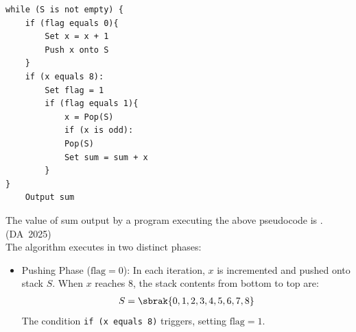\begin{enumerate}[label=\thesubsection.\arabic*, ref=\thesubsection.\theenumi]
\begin{lstlisting}[frame=single, basicstyle=\rmfamily, xleftmargin=0pt]
while (S is not empty) {
	if (flag equals 0){
		Set x = x + 1
		Push x onto S
	}
	if (x equals 8):
		Set flag = 1
		if (flag equals 1){
			x = Pop(S)
			if (x is odd):
			Pop(S)
			Set sum = sum + x
		}
}
	Output sum
\end{lstlisting}
The value of sum output by a program executing the above pseudocode is \underline{\hspace{1.5cm}}.
\hfill (DA~2025)
\\
\solution
The algorithm executes in two distinct phases:
\begin{itemize}
	\item Pushing Phase ($\text{flag} = 0$):
	In each iteration, $x$ is incremented and pushed onto stack $S$. When $x$ reaches $8$, the stack contents from bottom to top are:
	\begin{align}
		S = \sbrak{0, 1, 2, 3, 4, 5, 6, 7, 8}
	\end{align}
	The condition \texttt{if (x equals 8)} triggers, setting $\text{flag} = 1$.
	

\end{itemize}
\end{enumerate}
